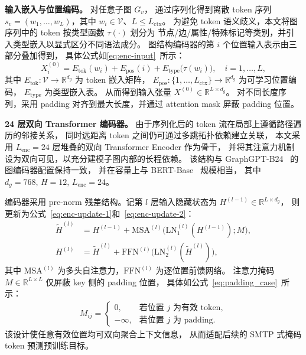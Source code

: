 \textbf{输入嵌入与位置编码。}
对任意子图 $G_v$，
通过序列化得到离散 token 序列
$s_v=(w_1,\dots,w_L)$，其中 $w_i\in\mathcal{V}$、$L\le L_{\mathrm{ctx}}$。
为避免 token 语义歧义，本文将图序列中的 token 按类型函数 $\tau(\cdot)$ 划分为
节点/边/属性/特殊标记等类别，并引入类型嵌入以显式区分不同语法成分。
图结构编码器的第 $i$ 个位置输入表示由三部分叠加得到，
具体公式如\ref{eq:enc-input}\ 所示：
\begin{equation}
  X^{(0)}_i
  = E_{\mathrm{tok}}(w_i)
  + E_{\mathrm{pos}}(i)
  + E_{\mathrm{type}}\!\big(\tau(w_i)\big),
  \quad i = 1,\dots,L,
  \label{eq:enc-input}
\end{equation}
其中 $E_{\mathrm{tok}}:\mathcal{V}\rightarrow\mathbb{R}^{d_g}$ 为 token 嵌入矩阵，
$E_{\mathrm{pos}}:\{1,\dots,L_{\mathrm{ctx}}\}\rightarrow\mathbb{R}^{d_g}$ 为可学习位置编码，
$E_{\mathrm{type}}$ 为类型嵌入表。
从而得到输入张量
$X^{(0)}\in\mathbb{R}^{L\times d_g}$。
对不同长度序列，采用 padding 对齐到最大长度，并通过 attention mask 屏蔽 padding 位置。

\textbf{24 层双向 Transformer 编码器。}
由于序列化后的 token 流在局部上遵循路径遍历的邻接关系，
同时远距离 token 之间仍可通过多跳拓扑依赖建立关联，
本文采用 $L_{\mathrm{enc}}=24$ 层堆叠的双向 Transformer Encoder 作为骨干，
并将其注意力机制设为双向可见，以充分建模子图内部的长程依赖。
该结构与 GraphGPT-B24~\cite{Zhao2023GraphGPTGP} 的图编码器配置保持一致，
并在容量上与 BERT-Base ~\cite{BERT}规模相当，
其中$d_g=768,\,H=12,\,L_{\mathrm{enc}}=24$。

编码器采用 pre-norm 残差结构。记第 $l$ 层输入隐藏状态为
$H^{(l-1)}\in\mathbb{R}^{L\times d_g}$，
则更新为公式~\ref{eq:enc-update-1}和~\ref{eq:enc-update-2}：
\begin{align}
  \tilde{H}^{(l)}
  &= H^{(l-1)}
     + \mathrm{MSA}^{(l)}\!\big(\mathrm{LN}_1^{(l)}(H^{(l-1)}); M\big),
  \label{eq:enc-update-1}
  \\
  H^{(l)}
  &= \tilde{H}^{(l)}
     + \mathrm{FFN}^{(l)}\!\big(\mathrm{LN}_2^{(l)}(\tilde{H}^{(l)})\big),
  \label{eq:enc-update-2}
\end{align}
其中 $\mathrm{MSA}^{(l)}$ 为多头自注意力，$\mathrm{FFN}^{(l)}$ 为逐位置前馈网络。
注意力掩码 $M\in\mathbb{R}^{L\times L}$ 仅屏蔽 key 侧的 padding 位置，
具体如公式~\ref{eq:padding_case}\ 所示：
\begin{align}
M_{ij}=
\begin{cases}
0, & \text{若位置 } j \text{ 为有效 token},\\
-\infty, & \text{若位置 } j \text{ 为 padding}.
\end{cases}
\label{eq:padding_case}
\end{align}
该设计使任意有效位置均可双向聚合上下文信息，
从而适配后续的 SMTP 式掩码 token 预测预训练目标。

